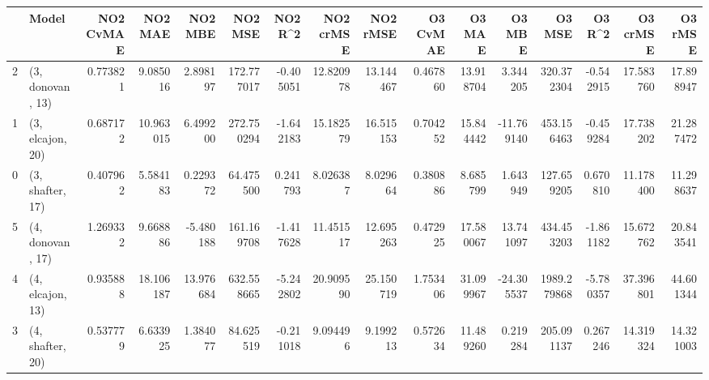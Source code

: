 \begin{tabular}{llrrrrrrrrrrrrrr}
\toprule
{} &             Model &  NO2 CvMAE &    NO2 MAE &    NO2 MBE &     NO2 MSE &   NO2 R\textasciicircum2 &  NO2 crMSE &   NO2 rMSE &  O3 CvMAE &     O3 MAE &     O3 MBE &       O3 MSE &    O3 R\textasciicircum2 &   O3 crMSE &    O3 rMSE \\
\midrule
2 &  (3, donovan, 13) &   0.773821 &   9.085016 &   2.898197 &  172.777017 & -0.405051 &  12.820978 &  13.144467 &  0.467860 &  13.918704 &   3.344205 &   320.372304 & -0.542915 &  17.583760 &  17.898947 \\
1 &  (3, elcajon, 20) &   0.687172 &  10.963015 &   6.499200 &  272.750294 & -1.642183 &  15.182579 &  16.515153 &  0.704252 &  15.844442 & -11.769140 &   453.156463 & -0.459284 &  17.738202 &  21.287472 \\
0 &  (3, shafter, 17) &   0.407962 &   5.584183 &   0.229372 &   64.475500 &  0.241793 &   8.026387 &   8.029664 &  0.380886 &   8.685799 &   1.643949 &   127.659205 &  0.670810 &  11.178400 &  11.298637 \\
5 &  (4, donovan, 17) &   1.269332 &   9.668886 &  -5.480188 &  161.169708 & -1.417628 &  11.451517 &  12.695263 &  0.472925 &  17.580067 &  13.741097 &   434.453203 & -1.861182 &  15.672762 &  20.843541 \\
4 &  (4, elcajon, 13) &   0.935888 &  18.106187 &  13.976684 &  632.558665 & -5.242802 &  20.909590 &  25.150719 &  1.753406 &  31.099967 & -24.305537 &  1989.279868 & -5.780357 &  37.396801 &  44.601344 \\
3 &  (4, shafter, 20) &   0.537779 &   6.633925 &   1.384077 &   84.625519 & -0.211018 &   9.094496 &   9.199213 &  0.572634 &  11.489260 &   0.219284 &   205.091137 &  0.267246 &  14.319324 &  14.321003 \\
\bottomrule
\end{tabular}
